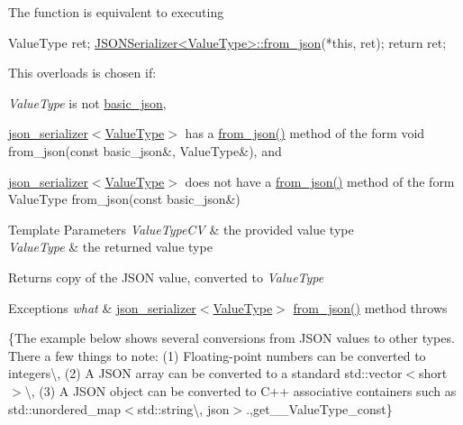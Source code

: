 The function is equivalent to executing 
\begin{DoxyCode}
ValueType ret;
\hyperlink{namespacenlohmann_1_1detail_a1f0395aad0fe853a4539288749d3a603}{JSONSerializer<ValueType>::from\_json}(*\textcolor{keyword}{this}, ret);
\textcolor{keywordflow}{return} ret;
\end{DoxyCode}


This overloads is chosen if\+:
\begin{DoxyItemize}
\item {\itshape Value\+Type} is not \hyperlink{classnlohmann_1_1basic__json}{basic\+\_\+json},
\item \hyperlink{classnlohmann_1_1basic__json_ad6ebc5da7ced975bb184133750e7d49f}{json\+\_\+serializer$<$\+Value\+Type$>$} has a {\ttfamily \hyperlink{namespacenlohmann_1_1detail_aef5c8ea108f4d2b03fb4a635617510de}{from\+\_\+json()}} method of the form {\ttfamily void from\+\_\+json(const basic\+\_\+json\&, Value\+Type\&)}, and
\item \hyperlink{classnlohmann_1_1basic__json_ad6ebc5da7ced975bb184133750e7d49f}{json\+\_\+serializer$<$\+Value\+Type$>$} does not have a {\ttfamily \hyperlink{namespacenlohmann_1_1detail_aef5c8ea108f4d2b03fb4a635617510de}{from\+\_\+json()}} method of the form {\ttfamily Value\+Type from\+\_\+json(const basic\+\_\+json\&)}
\end{DoxyItemize}


\begin{DoxyTemplParams}{Template Parameters}
{\em Value\+Type\+CV} & the provided value type \\
\hline
{\em Value\+Type} & the returned value type\\
\hline
\end{DoxyTemplParams}
\begin{DoxyReturn}{Returns}
copy of the J\+S\+ON value, converted to {\itshape Value\+Type} 
\end{DoxyReturn}

\begin{DoxyExceptions}{Exceptions}
{\em what} & \hyperlink{classnlohmann_1_1basic__json_ad6ebc5da7ced975bb184133750e7d49f}{json\+\_\+serializer$<$\+Value\+Type$>$} {\ttfamily \hyperlink{namespacenlohmann_1_1detail_aef5c8ea108f4d2b03fb4a635617510de}{from\+\_\+json()}} method throws\\
\hline
\end{DoxyExceptions}
\{The example below shows several conversions from J\+S\+ON values to other types. There a few things to note\+: (1) Floating-\/point numbers can be converted to integers\textbackslash{}, (2) A J\+S\+ON array can be converted to a standard {\ttfamily std\+::vector$<$short$>$}\textbackslash{}, (3) A J\+S\+ON object can be converted to C++ associative containers such as {\ttfamily std\+::unordered\+\_\+map$<$std\+::string\textbackslash{}, json$>$}.,get\+\_\+\+\_\+\+Value\+Type\+\_\+const\}

